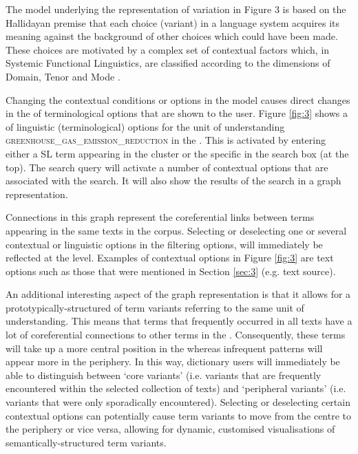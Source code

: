 \documentclass[output=paper]{langsci/langscibook.cls}
\begin{document}
The model underlying the representation of variation in Figure 3 is based on the 
Hallidayan premise that each choice (variant) in a language system acquires its 
meaning against the background of other choices which could have been made. These 
choices are motivated by a complex set of contextual factors which, in Systemic 
Functional Linguistics, are classified according to the dimensions of Domain, Tenor 
and Mode \citep{Eggins2004}.

Changing the contextual conditions or options in the model causes direct changes 
in the  of terminological options that are shown to the user. Figure \ref{fig:3} shows 
a  of linguistic (terminological) options for the unit of understanding 
\textsc{greenhouse\_gas\_emission\_reduction} in the . This 
 is activated by entering either a SL term appearing in the cluster or the 
specific  in the search box (at the top). The search query will activate 
a number of contextual options that are associated with the search. It will also 
show the results of the search in a graph representation. 

Connections in this graph represent the coreferential links between terms appearing 
in the same texts in the corpus. Selecting or deselecting one or several contextual 
or linguistic options in the filtering options, will immediately be reflected at 
the  level. Examples of contextual options in Figure \ref{fig:3} are text options 
such as those that were mentioned in Section \ref{sec:3} (e.g. text source).

An additional interesting aspect of the graph representation is that it allows 
for a prototypically-structured  of term variants referring to the 
same unit of understanding. This means that terms that frequently occurred in all 
texts have a lot of coreferential connections to other terms in the . Consequently, 
these terms will take up a more central position in the  whereas infrequent 
patterns will appear more in the periphery. In this way, dictionary users will 
immediately be able to distinguish between `core variants' (i.e. variants that 
are frequently encountered within the selected collection of texts) and `peripheral 
variants' (i.e. variants that were only sporadically encountered). Selecting or 
deselecting certain contextual options can potentially cause term variants to move 
from the centre to the periphery or vice versa, allowing for dynamic, customised 
visualisations of semantically-structured term variants.
\end{document}
